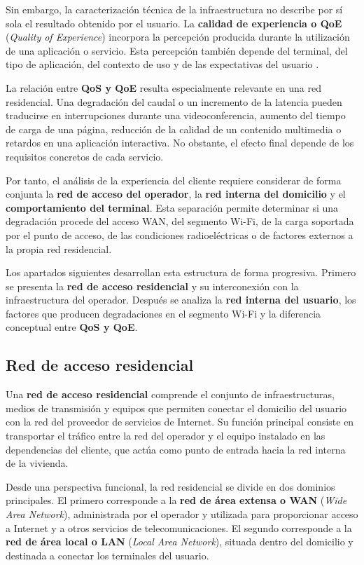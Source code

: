 Sin embargo, la caracterización técnica de la infraestructura no describe
por sí sola el resultado obtenido por el usuario. La
\textbf{calidad de experiencia o QoE}
(\textit{Quality of Experience}) incorpora la percepción producida
durante la utilización de una aplicación o servicio. Esta percepción
también depende del terminal, del tipo de aplicación, del contexto de uso
y de las expectativas del usuario \cite{itu_p10_g100}.

La relación entre \textbf{QoS y QoE} resulta especialmente relevante en
una red residencial. Una degradación del caudal o un incremento de la
latencia pueden traducirse en interrupciones durante una
videoconferencia, aumento del tiempo de carga de una página, reducción de
la calidad de un contenido multimedia o retardos en una aplicación
interactiva. No obstante, el efecto final depende de los requisitos
concretos de cada servicio.

Por tanto, el análisis de la experiencia del cliente requiere considerar
de forma conjunta la \textbf{red de acceso del operador}, la
\textbf{red interna del domicilio} y el
\textbf{comportamiento del terminal}. Esta separación permite determinar
si una degradación procede del acceso WAN, del segmento Wi-Fi, de la
carga soportada por el punto de acceso, de las condiciones
radioeléctricas o de factores externos a la propia red residencial.

Los apartados siguientes desarrollan esta estructura de forma
progresiva. Primero se presenta la \textbf{red de acceso residencial} y
su interconexión con la infraestructura del operador. Después se analiza
la \textbf{red interna del usuario}, los factores que producen
degradaciones en el segmento Wi-Fi y la diferencia conceptual entre
\textbf{QoS y QoE}.

\subsection{Red de acceso residencial}
\label{subsec:red-acceso-residencial}

Una \textbf{red de acceso residencial} comprende el conjunto de
infraestructuras, medios de transmisión y equipos que permiten conectar
el domicilio del usuario con la red del proveedor de servicios de
Internet. Su función principal consiste en transportar el tráfico entre
la red del operador y el equipo instalado en las dependencias del
cliente, que actúa como punto de entrada hacia la red interna de la
vivienda.

Desde una perspectiva funcional, la red residencial se divide en dos
dominios principales. El primero corresponde a la
\textbf{red de área extensa o WAN}
(\textit{Wide Area Network}), administrada por el operador y utilizada
para proporcionar acceso a Internet y a otros servicios de
telecomunicaciones. El segundo corresponde a la
\textbf{red de área local o LAN}
(\textit{Local Area Network}), situada dentro del domicilio y destinada
a conectar los terminales del usuario.

